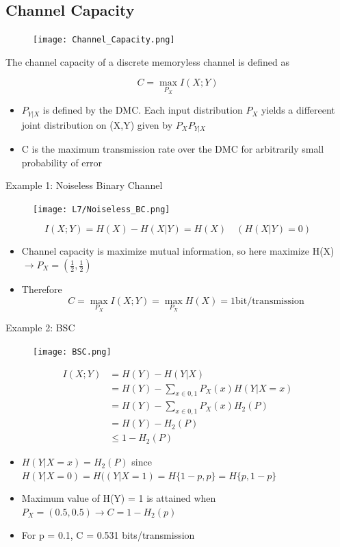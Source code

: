 \documentclass[12pt]{article}
\begin{document}
\subsection{Channel Capacity}
\begin{figure}[h]
    \centering
    \texttt{[image: Channel\_Capacity.png]}
\end{figure}
\centerline{\large The channel capacity of a discrete memoryless channel is defined as }

\[
C = \max_{P_X}I(X;Y)
\]
\begin{itemize}
    \item $P_{Y|X}$ is defined by the DMC. Each input distribution $P_X$ yields a differeent joint distribution on (X,Y) given by $P_X P_{Y|X}$
    \item C is the maximum transmission rate over the DMC for arbitrarily small probability of error
    
\end{itemize}
Example 1: Noiseless Binary Channel 
\begin{figure}[H]
    \centering
    \texttt{[image: L7/Noiseless\_BC.png]}
\end{figure}
\[
I(X;Y) = H(X) - H(X|Y) = H(X) \quad (H(X|Y)=0)
\]
\begin{itemize}

\item Channel capacity is maximize mutual information, so here maximize H(X) $\rightarrow P_X=(\frac{1}{2},\frac{1}{2})$
\item Therefore
\[
C = \max_{P_X}I(X;Y) = \max_{P_X}H(X) = 1 \textrm{bit/transmission}
\]
\end{itemize}

Example 2: BSC
\begin{figure}[H]
    \centering
    \texttt{[image: BSC.png]}
\end{figure}
\begin{align*}
    I(X;Y) &= H(Y) - H(Y|X) \\
    & = H(Y) - \sum_{x\in {0,1}}P_X(x)H(Y|X=x)\\
    & = H(Y) - \sum_{x\in {0,1}}P_X(x)H_2(P)\\
    & = H(Y) - H_2(P)\\
    & \le 1 - H_2(P)
\end{align*}
\begin{itemize}
    \item $H(Y|X=x)=H_2(P)$ since $H(Y|X=0) = H((Y|X=1) = H\{1-p,p\} = H\{p,1-p\}$
    \item Maximum value of H(Y) = 1 is attained when $P_X=(0.5,0.5) \rightarrow C=1-H_2(p)$
    \item For p = 0.1, C = 0.531 bits/transmission
\end{itemize}
\end{document}
